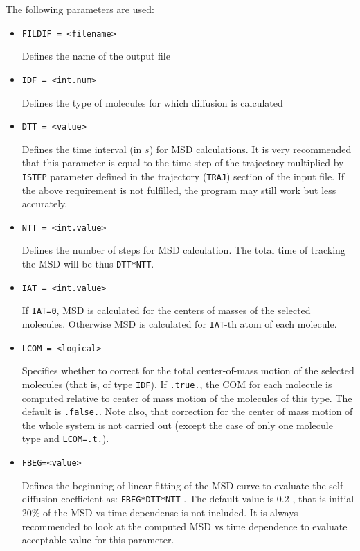 \documentclass{article}
\begin{document}
The following parameters are used:

\begin{itemize}

\item
\verb|FILDIF = <filename>|

Defines the name of the output file

\item
\verb|IDF = <int.num>|

Defines the type of molecules for which diffusion is calculated

\item
\verb|DTT = <value>|

Defines the time interval (in $s$) for MSD calculations. It is very recommended
that this parameter is equal to the time step of the trajectory multiplied
by \verb|ISTEP| parameter defined in the trajectory (\verb|TRAJ|) section
of the input file. If the above requirement is not fulfilled, the program
may still work but less accurately. 

\item
\verb|NTT = <int.value>|

Defines the number of steps for MSD calculation. The total time of tracking 
the MSD will be thus \verb|DTT*NTT|.

\item
\verb|IAT = <int.value>|

If \verb|IAT=0|, MSD is calculated for the centers of masses of the selected
molecules. Otherwise MSD is calculated for \verb|IAT|-th atom of each 
molecule. 

\item
\verb|LCOM = <logical>|

Specifies whether to correct for the total center-of-mass motion of the
selected molecules (that is, of type \verb|IDF|). If \verb|.true.|, the
COM for each molecule is computed relative to center of mass motion of
the molecules of this type. The default is \verb|.false.|. Note also, that
correction for the center of mass motion of the whole system is not
carried out (except the case of only one molecule type and 
\verb|LCOM=.t.|). 

\item
\verb|FBEG=<value>|

Defines the beginning of linear fitting of the MSD curve to evaluate the
self-diffusion coefficient as:  \verb|FBEG*DTT*NTT| . The default value
is 0.2 , that is initial 20\% of the MSD vs time dependense is not
included. It is always recommended to look at the computed MSD vs time
dependence to evaluate acceptable value for this parameter.

\end{itemize}
\end{document}
